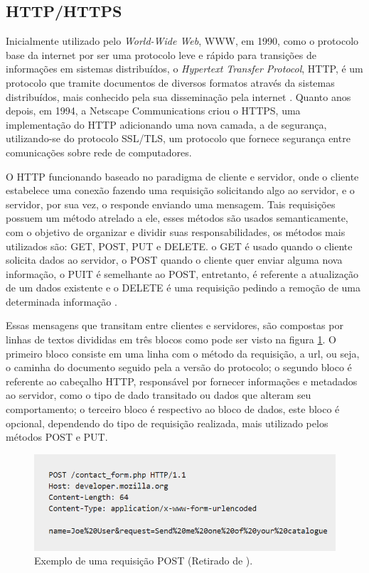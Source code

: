 \subsection{HTTP/HTTPS}
\label{fund:http}
Inicialmente utilizado pelo \textit{World-Wide Web}, WWW, em 1990, como o protocolo base da internet por ser uma protocolo leve e rápido para transições de informações em sistemas distribuídos, o \textit{Hypertext Transfer Protocol}, HTTP, é um protocolo que tramite documentos de diversos formatos através da sistemas distribuídos, mais conhecido pela sua disseminação pela internet \cite{berners1996hypertext}. Quanto anos depois, em 1994, a Netscape Communications criou o HTTPS, uma implementação do HTTP adicionando uma nova camada, a de segurança, utilizando-se do protocolo SSL/TLS, um protocolo que fornece segurança entre comunicações sobre rede de computadores.

O HTTP funcionando baseado no paradigma de cliente e servidor, onde o cliente estabelece uma conexão fazendo uma requisição solicitando algo ao servidor, e o servidor, por sua vez, o responde enviando uma mensagem.  Tais requisições possuem um método atrelado a ele, esses métodos são usados semanticamente, com o objetivo de organizar e dividir suas responsabilidades, os métodos mais utilizados são: GET, POST, PUT e DELETE. o GET é usado quando o cliente solicita dados ao servidor, o POST quando o cliente quer enviar alguma nova informação, o PUIT é semelhante ao POST, entretanto, é referente a atualização de um dados existente e o DELETE é uma requisição pedindo a remoção de uma determinada informação \cite{mozilla2019http}.

Essas mensagens que transitam entre clientes e servidores, são compostas por linhas de textos divididas em três blocos como pode ser visto na figura \ref{fig:post-request}. O primeiro bloco consiste em uma linha com o método da requisição, a url, ou seja, o caminha do documento seguido pela a versão do protocolo; o segundo bloco é referente ao cabeçalho HTTP, responsável por fornecer informações e metadados ao servidor, como o tipo de dado transitado ou dados que alteram seu comportamento; o terceiro bloco é respectivo ao bloco de dados, este bloco é opcional, dependendo do tipo de requisição realizada, mais utilizado pelos métodos POST e PUT.

\begin{figure}[H]
  \centering
  \includegraphics[width=.80\textwidth]{assets/post-request.png} 
  \caption{Exemplo de uma requisição POST (Retirado de \cite{mozilla2019http}).}
  \label{fig:post-request} 
\end{figure}

